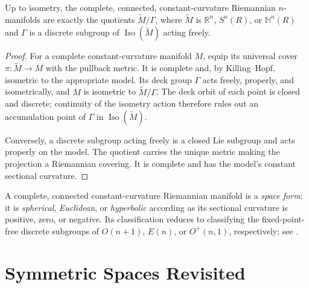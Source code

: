 \begin{corollary}
\label{cor:characterization-constant-curvature}

Up to isometry, the complete, connected, constant-curvature Riemannian
$n$-manifolds are exactly the quotients $\widetilde M/\Gamma$, where
$\widetilde M$ is $\mathbb R^n$, $S^n(R)$, or $\mathbb H^n(R)$ and $\Gamma$
is a discrete subgroup of $\operatorname{Iso}(\widetilde M)$ acting freely.
\begin{proof}
\sketch For a complete constant-curvature manifold $M$, equip its universal
cover $\pi:\widetilde M\to M$ with the pullback metric.  It is complete and,
by Killing--Hopf, isometric to the appropriate model.  Its deck group
$\Gamma$ acts freely, properly, and isometrically, and $M$ is isometric to
$\widetilde M/\Gamma$.  The deck orbit of each point is closed and discrete;
continuity of the isometry action therefore rules out an accumulation point
of $\Gamma$ in $\operatorname{Iso}(\widetilde M)$.

Conversely, a discrete subgroup acting freely is a closed Lie subgroup and
acts properly on the model.  The quotient carries the unique metric making
the projection a Riemannian covering.  It is complete and has the model's
constant sectional curvature.
\end{proof}
\end{corollary}

A complete, connected constant-curvature Riemannian manifold is a
\emph{space form}; it is \emph{spherical}, \emph{Euclidean}, or
\emph{hyperbolic} according as its sectional curvature is positive, zero, or
negative.  Its classification reduces to classifying the fixed-point-free
discrete subgroups of $O(n+1)$, $E(n)$, or $O^+(n,1)$, respectively; see
\cite{Wol11}.

\section{Symmetric Spaces Revisited}

